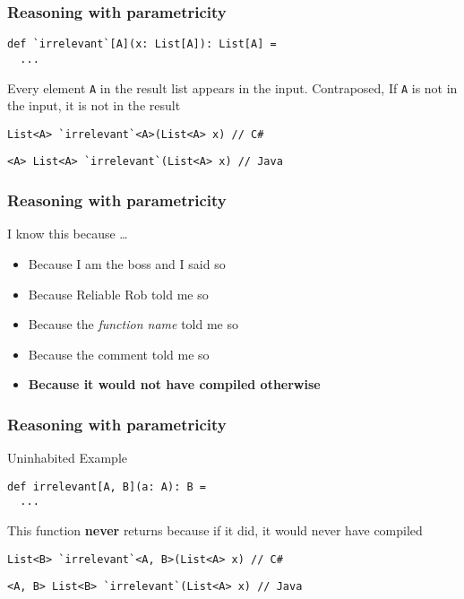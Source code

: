 \begin{frame}[fragile]
\frametitle{Reasoning with parametricity}
\begin{lstlisting}[style=scala]
def `irrelevant`[A](x: List[A]): List[A] = 
  ...
\end{lstlisting}
\begin{theorem}Every element \lstinline{A} in the result list appears in the input. Contraposed, If \lstinline{A} is not in the input, it is not in the result\end{theorem}
\tiny{
\begin{lstlisting}
List<A> `irrelevant`<A>(List<A> x) // C#
\end{lstlisting}
\begin{lstlisting}
<A> List<A> `irrelevant`(List<A> x) // Java
\end{lstlisting}
}

\end{frame}

\begin{frame}[fragile]
\frametitle{Reasoning with parametricity}
\begin{block}{I know this because \ldots}
\begin{itemize}
  \item<1> Because I am the boss and I said so
  \item<2> Because Reliable Rob told me so
  \item<3> Because the \emph{function name} told me so
  \item<4> Because the comment told me so
  \item<5> \textbf{Because it would not have compiled otherwise}
\end{itemize}
\end{block}
\end{frame}

\begin{frame}[fragile]
\frametitle{Reasoning with parametricity}
\begin{block}{Uninhabited Example}
\begin{lstlisting}[style=scala]
def irrelevant[A, B](a: A): B = 
  ...
\end{lstlisting}
\end{block}
\begin{theorem}This function \textbf{never} returns because if it did, it would
never have compiled\end{theorem}
\tiny{
\begin{lstlisting}
List<B> `irrelevant`<A, B>(List<A> x) // C#
\end{lstlisting}
\begin{lstlisting}
<A, B> List<B> `irrelevant`(List<A> x) // Java
\end{lstlisting}
}
\end{frame}

